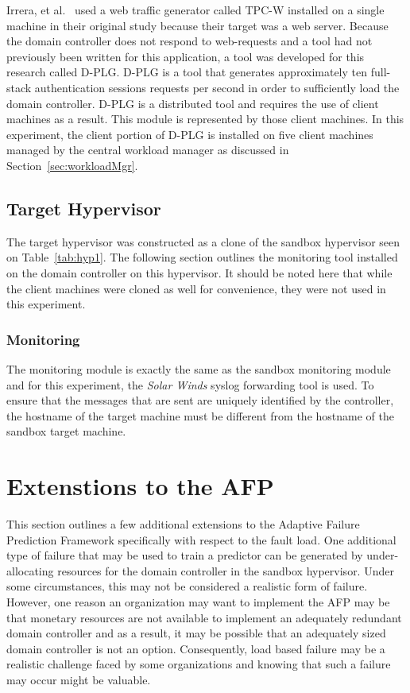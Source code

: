 Irrera, et al.~\cite{irrera2015} used a web traffic generator called TPC-W
installed on a single machine in their original study because their target was
a web server.  Because the domain controller does not respond to web-requests
and a tool had not previously been written for this application, a tool was
developed for this research called D-PLG. D-PLG is a tool that generates
approximately ten full-stack authentication sessions requests per second in
order to sufficiently load the domain controller.  D-PLG is a distributed tool
and requires the use of client machines as a result.  This module is
represented by those client machines.  In this experiment, the client portion
of D-PLG is installed on five client machines managed by the central workload
manager as discussed in Section~\ref{sec:workloadMgr}.

\subsection{Target Hypervisor} \label{sec:target}
The target hypervisor was constructed as a clone of the sandbox hypervisor seen
on Table~\ref{tab:hyp1}.  The following section outlines the monitoring tool
installed on the domain controller on this hypervisor.  It should be noted here
that while the client machines were cloned as well for convenience, they were
not used in this experiment.

\subsubsection{Monitoring} \label{sec:targetMonitoringTool}
The monitoring module is exactly the same as the sandbox monitoring module and
for this experiment, the \emph{Solar Winds} syslog forwarding tool is used.  To
ensure that the messages that are sent are uniquely identified by the
controller, the hostname of the target machine must be different from the
hostname of the sandbox target machine.

\setcounter{secnumdepth}{3}

\section{Extenstions to the AFP} \label{sec:extensions}
This section outlines a few additional extensions to the Adaptive Failure
Prediction Framework specifically with respect to the fault load.  One
additional type of failure that may be used to train a predictor can be
generated by under-allocating resources for the domain controller in the
sandbox hypervisor.  Under some circumstances, this may not be considered a
realistic form of failure.  However, one reason an organization may want to
implement the AFP may be that monetary resources are not available to implement
an adequately redundant domain controller and as a result, it may be possible
that an adequately sized domain controller is not an option.  Consequently,
load based failure may be a realistic challenge faced by some organizations and
knowing that such a failure may occur might be valuable.

